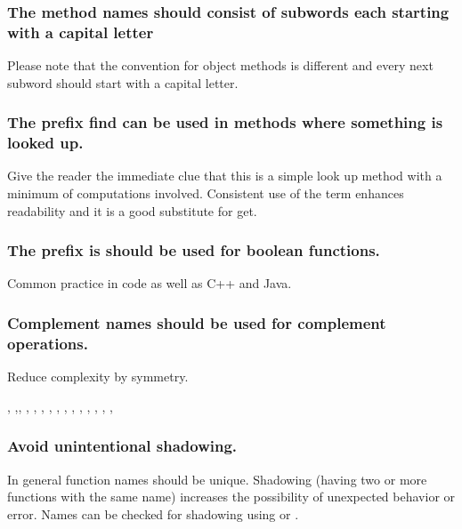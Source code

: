 \documentclass[titlepage,a4paper,12pt]{article}
\begin{document}
\subsubsection{The method names should consist of subwords each starting with a capital letter} Please note that the convention for object methods is different and every next subword should start with a capital letter.


 \subsubsection{The
prefix find can be used in methods where something is looked up.}
Give the reader the immediate clue that this is a simple look up
method with a minimum of computations involved. Consistent use of
the term enhances readability and it is a good substitute for get.


\subsubsection{ The prefix is should be used for boolean
functions.} Common practice in \TMW code as well as C++ and Java.

 \subsubsection{Complement names should be used for complement
operations.} Reduce complexity by symmetry.
\begin{flushleft}
, ,,
, ,
, ,
, , ,
, , ,
, , 
\end{flushleft}


\subsubsection{ Avoid
unintentional shadowing.}

In general function names should be unique. Shadowing (having two or
more functions with the same name) increases the possibility of
unexpected behavior or error. Names can be checked for shadowing
using  or .
\end{document}
